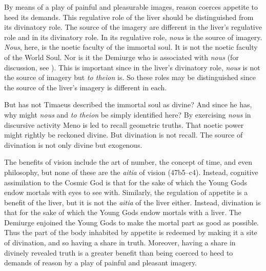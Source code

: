 By means of a play of painful and pleasurable images, reason coerces appetite to heed its demands. This regulative role of the liver should be distinguished from its divinatory role. The source of the imagery are different in the liver's regulative role and in its divinatory role. In its regulative role, \emph{nous} is the source of imagery. \emph{Nous}, here, is the noetic faculty of the immortal soul. It is not the noetic faculty of the World Soul. Nor is it the Demiurge who is associated with \emph{nous} (for discussion, see \citealt{Menn:1992ez}). This is important since in the liver's divinatory role, \emph{nous} is not the source of imagery but \emph{to theion} is. So these roles may be distinguished since the source of the liver's imagery is different in each. 

But has not Timaeus described the immortal soul as divine? And since he has, why might \emph{nous} and \emph{to theion} be simply identified here? By exercising \emph{nous} in discursive activity Meno is led to recall geometric truths. That noetic power might rightly be reckoned divine. But divination is not recall. The source of divination is not only divine but exogenous.

The benefits of vision include the art of number, the concept of time, and even philosophy, but none of these are the \emph{aitia} of vision (47b5--c4). Instead, cognitive assimilation to the Cosmic God is that for the sake of which the Young Gods endow mortals with eyes to see with. Similarly, the regulation of appetite is a benefit of the liver, but it is not the \emph{aitia} of the liver either. Instead, divination is that for the sake of which the Young Gods endow mortals with a liver. The Demiurge enjoined the Young Gods to make the mortal part as good as possible. Thus the part of the body inhabited by appetite is redeemed by making it a site of divination, and so having a share in truth. Moreover, having a share in divinely revealed truth is a greater benefit than being coerced to heed to demands of reason by a play of painful and pleasant imagery.

